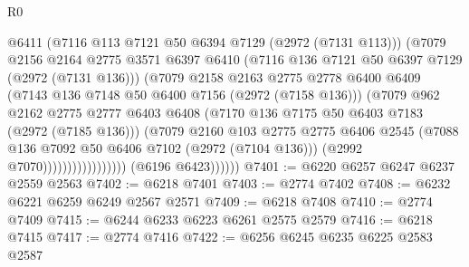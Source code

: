 \begin{lexlean}{R0}
\begin{coremodule}
                                      @6411
                                      (@7116 @113 @7121 @50 @6394 @7129 (@2972 (@7131 @113)))
                                      (@7079
                                        @2156
                                        @2164
                                        @2775
                                        @3571
                                        @6397
                                        @6410
                                        (@7116 @136 @7121 @50 @6397 @7129 (@2972 (@7131 @136)))
                                        (@7079
                                          @2158
                                          @2163
                                          @2775
                                          @2778
                                          @6400
                                          @6409
                                          (@7143 @136 @7148 @50 @6400 @7156 (@2972 (@7158 @136)))
                                          (@7079
                                            @962
                                            @2162
                                            @2775
                                            @2777
                                            @6403
                                            @6408
                                            (@7170 @136 @7175 @50 @6403 @7183 (@2972 (@7185 @136)))
                                            (@7079
                                              @2160
                                              @103
                                              @2775
                                              @2775
                                              @6406
                                              @2545
                                              (@7088
                                                @136
                                                @7092
                                                @50
                                                @6406
                                                @7102
                                                (@2972 (@7104 @136)))
                                              (@2992 @7070)))))))))))))))))
              (@6196 @6423))))))
@7401 := @6220 @6257 @6247 @6237 @2559 @2563
@7402 := @6218 @7401
@7403 := @2774 @7402
@7408 := @6232 @6221 @6259 @6249 @2567 @2571
@7409 := @6218 @7408
@7410 := @2774 @7409
@7415 := @6244 @6233 @6223 @6261 @2575 @2579
@7416 := @6218 @7415
@7417 := @2774 @7416
@7422 := @6256 @6245 @6235 @6225 @2583 @2587

\end{coremodule}
\end{lexlean}
